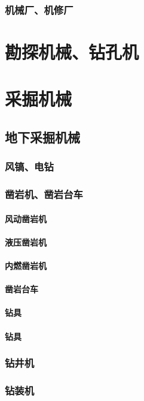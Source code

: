 \documentclass[UTF8]{../../ApplicationUniverse}
\begin{document}
    \subsubsection{机械厂、机修厂}
\section{勘探机械、钻孔机}
\section{采掘机械}
    \subsection{地下采掘机械}
        \subsubsection{风镐、电钻}
        \subsubsection{凿岩机、凿岩台车}
            \paragraph{风动凿岩机}
            \paragraph{液压凿岩机}
            \paragraph{内燃凿岩机}
            \paragraph{凿岩台车}
            \paragraph{钻具}
            \paragraph{钻具}
        \subsubsection{钻井机}
        \subsubsection{钻装机}
\end{document}
